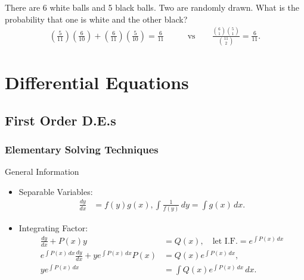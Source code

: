 \documentclass[oneside]{book}
\begin{document}
\begin{example}{}{}
  There are 6 white balls and 5 black balls. Two are randomly drawn. What is the probability that one is white and the other black?
  \begin{align*}
    \left(\frac{5}{11}\right)\left(\frac{6}{10}\right)+\left(\frac{6}{11}\right)\left(\frac{5}{10}\right)=\frac{6}{11} \qquad&\text{vs}\qquad \frac{\binom{6}{1}\binom{5}{1}}{\binom{11}{2}}=\frac{6}{11}.
  \end{align*}
\end{example}

\chapter{Differential Equations}
\section{First Order D.E.s}
\subsection{Elementary Solving Techniques}
\begin{stbox}{General Information}
  \begin{itemize}
    \item Separable Variables:
    \begin{align*}
      \frac{dy}{dx}&=f(y)g(x),
      \int \frac{1}{f(y)}\,dy=\int g(x)\,dx.
    \end{align*}
    \item Integrating Factor:
    \begin{align*}
      \frac{dy}{dx}+P(x)y&=Q(x),\quad\text{let I.F.}=e^{\int P(x)\,dx}\\
      e^{\int P(x)\,dx} \frac{dy}{dx}+ye^{\int P(x)\,dx}P(x)&=Q(x)e^{\int P(x)\,dx},\\
      ye^{\int P(x)\,dx}&=\int Q(x)e^{\int P(x)\,dx}\,dx.
    \end{align*}
  \end{itemize}
\end{stbox}
\end{document}
